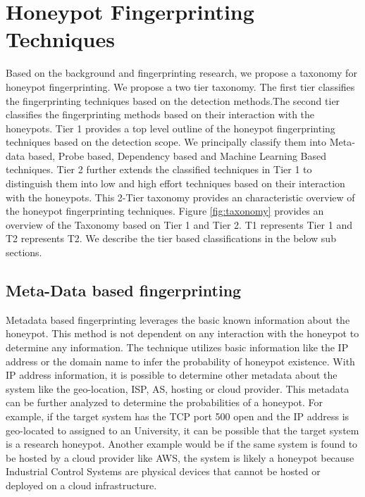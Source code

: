 \section{Honeypot Fingerprinting Techniques}
\label{sec:hft}



Based on the background and fingerprinting research, we propose a taxonomy for honeypot fingerprinting. 
We propose a two tier taxonomy. The first tier classifies the fingerprinting techniques based on the detection methods.The second tier classifies the fingerprinting methods based on their interaction with the honeypots.
Tier 1 provides a top level outline of the honeypot fingerprinting techniques based on the detection scope. We principally classify them into Meta-data based, Probe based, Dependency based and Machine Learning Based techniques. Tier 2 further extends the classified techniques in Tier 1 to distinguish them into low and high effort techniques based on their interaction with the honeypots. This 2-Tier taxonomy provides an characteristic overview of the honeypot fingerprinting techniques. Figure \ref{fig:taxonomy} provides an overview of the Taxonomy based on Tier 1 and Tier 2. T1 represents Tier 1 and T2 represents T2. We describe the tier based classifications in the below sub sections. 


\subsection{Meta-Data based fingerprinting}
Metadata based fingerprinting leverages the basic known information about the honeypot. This method is  not dependent on any interaction with the honeypot to determine any information. The technique utilizes basic information like the IP address or the domain name to infer the probability of honeypot existence. With IP address information, it is possible to determine other metadata about the system like the geo-location, ISP, AS, hosting or cloud provider. This metadata can be further analyzed to determine the probabilities of a honeypot. For example, if the target system has the TCP port 500 open and the IP address is geo-located to assigned to an University, it can be possible that the target system is a research honeypot. Another example would be if the same system is found to be hosted by a cloud provider like AWS, the system is likely a honeypot because Industrial Control Systems are physical devices that cannot be hosted or deployed on a cloud infrastructure.

